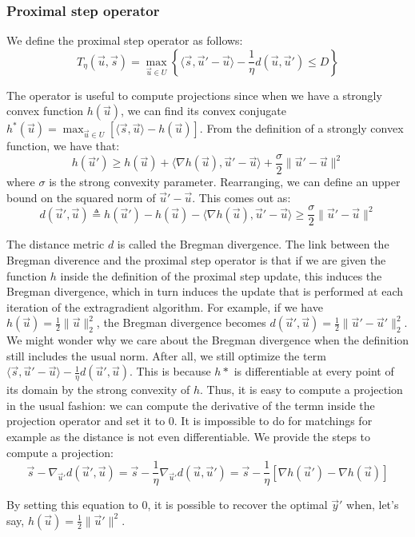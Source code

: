 \subsubsection{Proximal step operator}
We define the proximal step operator as follows:
\begin{equation}
  {T}_{\eta}(\vec u, \vec s) = \max_{\vec u \in {U}} \left \{
\langle \vec s, \vec u' - \vec u \rangle - \frac{1}{\eta} d(\vec u, \vec u')
\leq D \right \}
\end{equation}

The operator is useful to compute projections since when we have a strongly
convex function $h(\vec u)$, we can find its convex conjugate $h^*(\vec u) =
\max_{\vec u \in {U}} \left [ \langle \vec s, \vec u \rangle - h(\vec u)
\right ]$. From the definition of a strongly convex function, we have that:
\begin{equation}
  h(\vec u') \geq h(\vec u) + \langle \nabla h(\vec u), \vec u' - \vec u \rangle
+ \frac{\sigma}{2} \lVert \vec u' - \vec u \rVert^2
\end{equation}
where $\sigma$ is the strong convexity parameter. Rearranging, we can define an
upper bound on the squared norm of $\vec u' - \vec u$. This comes out as:
\begin{equation}
  d(\vec u', \vec u) \triangleq h(\vec u') - h(\vec u) - \langle \nabla h(\vec u), \vec u' - \vec u \rangle \geq \frac{\sigma}{2} \lVert \vec u' - \vec u \rVert^2
\end{equation}

The distance metric $d$ is called the Bregman divergence. The link between the
Bregman diverence and the proximal step operator is that if we are given the
function $h$ inside the definition of the proximal step update, this induces the
Bregman divergence, which in turn induces the update that is performed at each
iteration of the extragradient algorithm. For example, if we have $h(\vec u) =
\frac{1}{2} \lVert \vec u \rVert_2^2 $, the Bregman divergence becomes $d(\vec
u', \vec u) = \frac{1}{2} \lVert \vec u' - \vec u' \rVert_2^2$. We might wonder
why we care about the Bregman divergence when the definition still includes the
usual norm. After all, we still optimize the term $\langle \vec s, \vec u' -
\vec u \rangle - \frac{1}{\eta} d(\vec u', \vec u)$. This is because $h*$ is
differentiable at every point of its domain by the strong convexity of $h$.
Thus, it is easy to compute a projection in the usual fashion: we can compute
the derivative of the termn inside the projection operator and set it to 0. It
is impossible to do for matchings for example as the distance is not even
differentiable. We provide the steps to compute a projection:
\begin{equation}
  \vec s - \nabla_{\vec u'} d(\vec u', \vec u) = \vec s - \frac{1}{\eta}
\nabla_{\vec u'} d(\vec u, \vec u') = \vec s - \frac{1}{\eta} \left [\nabla
h(\vec u') - \nabla h(\vec u) \right]
\end{equation}

By setting this equation to 0, it is possible to recover the optimal $\vec y'$
when, let's say, $h(\vec u) = \frac{1}{2} \lVert \vec u' \rVert^2$.


